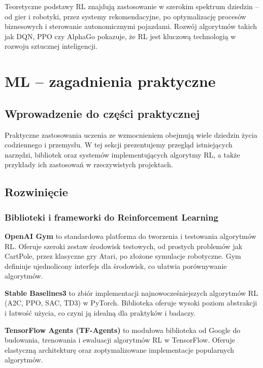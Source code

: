 \documentclass[12pt,a4paper]{article}
\begin{document}
Teoretyczne podstawy RL znajdują zastosowanie w szerokim spektrum dziedzin -- od gier i robotyki, przez systemy rekomendacyjne, po optymalizację procesów biznesowych i sterowanie autonomicznymi pojazdami. Rozwój algorytmów takich jak DQN, PPO czy AlphaGo pokazuje, że RL jest kluczową technologią w rozwoju sztucznej inteligencji.

\newpage

\section{ML -- zagadnienia praktyczne}

\subsection{Wprowadzenie do części praktycznej}

Praktyczne zastosowania uczenia ze wzmocnieniem obejmują wiele dziedzin życia codziennego i przemysłu. W tej sekcji prezentujemy przegląd istniejących narzędzi, bibliotek oraz systemów implementujących algorytmy RL, a także przykłady ich zastosowań w rzeczywistych projektach.

\subsection{Rozwinięcie}

\subsubsection{Biblioteki i frameworki do Reinforcement Learning}

\textbf{OpenAI Gym} to standardowa platforma do tworzenia i testowania algorytmów RL. Oferuje szeroki zestaw środowisk testowych, od prostych problemów jak CartPole, przez klasyczne gry Atari, po złożone symulacje robotyczne. Gym definiuje ujednolicony interfejs dla środowisk, co ułatwia porównywanie algorytmów.

\textbf{Stable Baselines3} to zbiór implementacji najnowocześniejszych algorytmów RL (A2C, PPO, SAC, TD3) w PyTorch. Biblioteka oferuje wysoki poziom abstrakcji i łatwość użycia, co czyni ją idealną dla praktyków i badaczy.

\textbf{TensorFlow Agents (TF-Agents)} to modułowa biblioteka od Google do budowania, trenowania i ewaluacji algorytmów RL w TensorFlow. Oferuje elastyczną architekturę oraz zoptymalizowane implementacje popularnych algorytmów.
\end{document}
